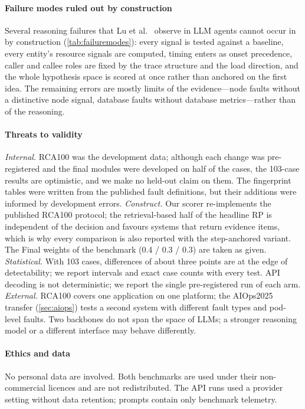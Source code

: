 \paragraph{Failure modes ruled out by construction}
Several reasoning failures that Lu et al.\ \citep{lu2026beyond} observe in LLM agents cannot occur in \gama{} by construction
(\cref{tab:failuremodes}): every signal is tested against a baseline, every entity's resource signals are computed, timing enters as
onset precedence, caller and callee roles are fixed by the trace structure and the load direction, and the whole hypothesis space is
scored at once rather than anchored on the first idea. The remaining errors are mostly limits of the evidence---node faults without a
distinctive node signal, database faults without database metrics---rather than of the reasoning.

\paragraph{Threats to validity}
\emph{Internal.} RCA100 was the development data; although each change was pre-registered and the final modules were developed on
half of the cases, the 103-case results are optimistic, and we make no held-out claim on them. The fingerprint tables were written
from the published fault definitions, but their additions were informed by development errors. \emph{Construct.} Our scorer
re-implements the published RCA100 protocol; the retrieval-based half of the headline RP is independent of the decision and
favours systems that return evidence items, which is why every comparison is also reported with the step-anchored variant. The
Final weights of the benchmark (0.4 / 0.3 / 0.3) are taken as given. \emph{Statistical.} With 103 cases, differences of about three
points are at the edge of detectability; we report intervals and exact case counts with every test. API decoding is not
deterministic; we report the single pre-registered run of each arm. \emph{External.} RCA100 covers one application on one platform;
the AIOps2025 transfer (\cref{sec:aiops}) tests a second system with different fault types and pod-level faults. Two backbones do not
span the space of LLMs; a stronger reasoning model or a different interface may behave differently.

\paragraph{Ethics and data}
No personal data are involved. Both benchmarks are used under their non-commercial licences and are not redistributed. The API runs
used a provider setting without data retention; prompts contain only benchmark telemetry.
